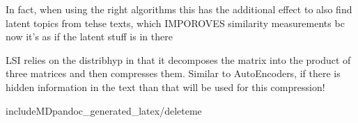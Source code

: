\textcite{Deerwester}

In fact, when using the right algorithms this has the additional effect to also find latent topics from tehse texts, which IMPOROVES similarity measurements bc now it's as if the latent stuff is in there

LSI relies on the \gls{distribhyp} in that it decomposes the matrix into the product of three matrices and then compresses them. Similar to AutoEncoders, if there is hidden information in the text than that will be used for this compression! 


includeMD{pandoc_generated_latex/deleteme}













